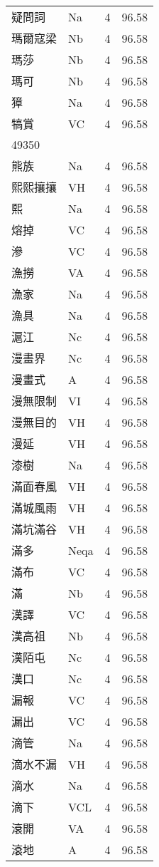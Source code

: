 \documentclass[twocolumn]{book}
\begin{document}
\begin{supertabular}{llrr}
疑問詞 & Na & 4 &  96.58\\
瑪爾寇梁 & Nb & 4 &  96.58\\
瑪莎 & Nb & 4 &  96.58\\
瑪可 & Nb & 4 &  96.58\\
獐 & Na & 4 &  96.58\\
犒賞 & VC & 4 &  96.58\\
49350\\
熊族 & Na & 4 &  96.58\\
熙熙攘攘 & VH & 4 &  96.58\\
熙 & Na & 4 &  96.58\\
熔掉 & VC & 4 &  96.58\\
滲 & VC & 4 &  96.58\\
漁撈 & VA & 4 &  96.58\\
漁家 & Na & 4 &  96.58\\
漁具 & Na & 4 &  96.58\\
滬江 & Nc & 4 &  96.58\\
漫畫界 & Nc & 4 &  96.58\\
漫畫式 & A & 4 &  96.58\\
漫無限制 & VI & 4 &  96.58\\
漫無目的 & VH & 4 &  96.58\\
漫延 & VH & 4 &  96.58\\
漆樹 & Na & 4 &  96.58\\
滿面春風 & VH & 4 &  96.58\\
滿城風雨 & VH & 4 &  96.58\\
滿坑滿谷 & VH & 4 &  96.58\\
滿多 & Neqa & 4 &  96.58\\
滿布 & VC & 4 &  96.58\\
滿 & Nb & 4 &  96.58\\
漢譯 & VC & 4 &  96.58\\
漢高祖 & Nb & 4 &  96.58\\
漢陌屯 & Nc & 4 &  96.58\\
漢口 & Nc & 4 &  96.58\\
漏報 & VC & 4 &  96.58\\
漏出 & VC & 4 &  96.58\\
滴管 & Na & 4 &  96.58\\
滴水不漏 & VH & 4 &  96.58\\
滴水 & Na & 4 &  96.58\\
滴下 & VCL & 4 &  96.58\\
滾開 & VA & 4 &  96.58\\
滾地 & A & 4 &  96.58\\

\end{supertabular}
\end{document}

